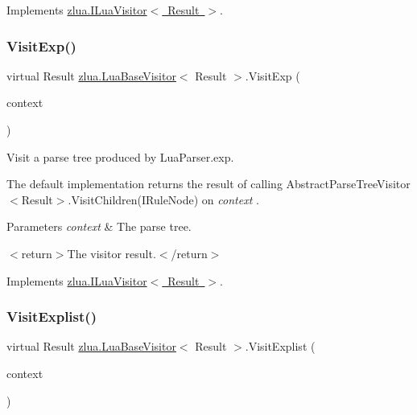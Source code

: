 Implements \mbox{\hyperlink{interfacezlua_1_1_i_lua_visitor_a947d61d77abed1edc930be81be7c3e8f}{zlua.\+I\+Lua\+Visitor$<$ Result $>$}}.

\mbox{\label{classzlua_1_1_lua_base_visitor_a0432a2115a2a561a97b72c9240082e28}} 
\subsubsection{\texorpdfstring{Visit\+Exp()}{VisitExp()}}
{\footnotesize\ttfamily virtual Result \mbox{\hyperlink{classzlua_1_1_lua_base_visitor}{zlua.\+Lua\+Base\+Visitor}}$<$ Result $>$.Visit\+Exp (\begin{DoxyParamCaption}\item[{\mbox{[}\+Not\+Null\mbox{]} \mbox{\hyperlink{classzlua_1_1_lua_parser_1_1_exp_context}{Lua\+Parser.\+Exp\+Context}}}]{context }\end{DoxyParamCaption})\hspace{0.3cm}{\ttfamily [virtual]}}



Visit a parse tree produced by Lua\+Parser.\+exp. 

The default implementation returns the result of calling Abstract\+Parse\+Tree\+Visitor$<$\+Result$>$.\+Visit\+Children(\+I\+Rule\+Node) on {\itshape context} . 


\begin{DoxyParams}{Parameters}
{\em context} & The parse tree.\\
\hline
\end{DoxyParams}
$<$return$>$The visitor result.$<$/return$>$ 

Implements \mbox{\hyperlink{interfacezlua_1_1_i_lua_visitor_a9fc764fe97efdcef87b716de7d157d72}{zlua.\+I\+Lua\+Visitor$<$ Result $>$}}.

\mbox{\label{classzlua_1_1_lua_base_visitor_a3ff9e871538d959c429d61daf4f8c0c3}} 
\subsubsection{\texorpdfstring{Visit\+Explist()}{VisitExplist()}}
{\footnotesize\ttfamily virtual Result \mbox{\hyperlink{classzlua_1_1_lua_base_visitor}{zlua.\+Lua\+Base\+Visitor}}$<$ Result $>$.Visit\+Explist (\begin{DoxyParamCaption}\item[{\mbox{[}\+Not\+Null\mbox{]} \mbox{\hyperlink{classzlua_1_1_lua_parser_1_1_explist_context}{Lua\+Parser.\+Explist\+Context}}}]{context }\end{DoxyParamCaption})\hspace{0.3cm}{\ttfamily [virtual]}}



